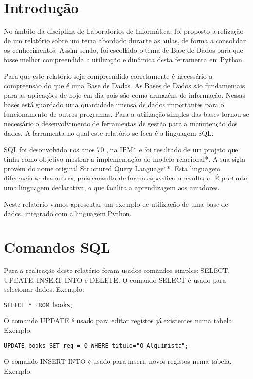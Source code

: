 \documentclass[11pt,openright,oneside]{report}
\begin{document}

\chapter{Introdução}
\label{chap.introducao}
No âmbito da disciplina de Laboratórios de Informática, foi proposto a relização de um relatório sobre um tema abordado durante as aulas, de forma a consolidar os conhecimentos. Assim sendo, foi escolhido o tema de Base de Dados para que fosse melhor compreendida a utilização e dinâmica desta ferramenta em Python.

Para que este relatório seja compreendido corretamente é necessário a compreensão do que é uma Base de Dados.
As Bases de Dados são fundamentais para as aplicações de hoje em dia pois são como armazéns de informação. Nessas bases está guardado uma quantidade imensa de dados importantes para o funcionamento de outros programas. 
Para a utilização simples das bases tornou-se necessário o desenvolvimento de ferramentas de gestão para a manutenção dos dados. A ferramenta no qual este relatório se foca é a linguagem SQL.

SQL foi desonvolvido nos anos 70 , na IBM* e foi resultado de um projeto que tinha como objetivo mostrar a implementação do modelo relacional*. A sua sigla provém do nome original Structured Query Language**.
Esta linguagem diferencia-se das outras, pois consulta de forma específica o resultado. É portanto uma linguagem declarativa, o que facilita a aprendizagem aos amadores.

Neste relatório vamos apresentar um exemplo de utilização de uma base de dados, integrado com a linguagem Python.

\chapter{Comandos SQL}
\label{chap.comandos}

Para a realização deste relatório foram usados comandos simples: SELECT, UPDATE, INSERT INTO e DELETE.
O comando SELECT é usado para selecionar dados.
Exemplo:

\begin{verbatim}
SELECT * FROM books;
\end{verbatim}
O comando UPDATE é usado para editar registos já existentes numa tabela.
Exemplo:

\begin{verbatim}
UPDATE books SET req = 0 WHERE titulo="O Alquimista";
\end{verbatim}
O comando INSERT INTO é usado para inserir novos registos numa tabela.
Exemplo:
\end{document}
